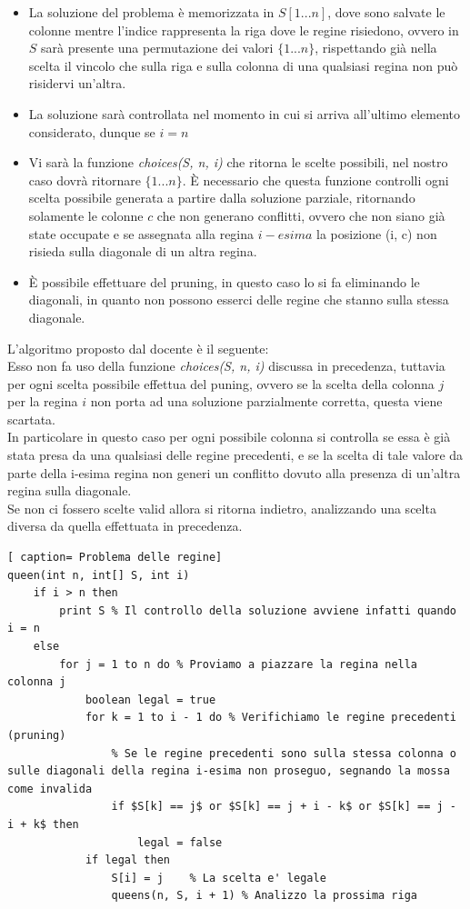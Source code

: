 \documentclass[../cheatSheetAlgoritmi.tex]{subfiles}
\begin{document}
\begin{itemize}
	\item La soluzione del problema è memorizzata in $S[1 ... n]$, dove sono salvate le colonne mentre l'indice rappresenta la riga dove le regine risiedono, ovvero in $S$ sarà presente una permutazione dei valori $\{1 ... n\}$, rispettando già nella scelta il vincolo che sulla riga e sulla colonna di una qualsiasi regina non può risidervi un'altra.
	\item La soluzione sarà controllata nel momento in cui si arriva all'ultimo elemento considerato, dunque se $i = n$
	\item Vi sarà la funzione \emph{choices(S, n, i)} che ritorna le scelte possibili, nel nostro caso dovrà ritornare $\{1 ... n\}$. È necessario che questa funzione controlli ogni scelta possibile generata a partire dalla soluzione parziale, ritornando solamente le colonne $c$ che non generano conflitti, ovvero che non siano già state occupate e se assegnata alla regina $i-esima$ la posizione (i, c) non risieda sulla diagonale di un altra regina.
	\item È possibile effettuare del pruning, in questo caso lo si fa eliminando le diagonali, in quanto non possono esserci delle regine che stanno sulla stessa diagonale.
\end{itemize}
L'algoritmo proposto dal docente è il seguente: \\
Esso non fa uso della funzione \emph{choices(S, n, i)} discussa in precedenza, tuttavia per ogni scelta possibile effettua del puning, ovvero se la scelta della colonna $j$ per la regina $i$ non porta ad una soluzione parzialmente corretta, questa viene scartata. \\
In particolare in questo caso per ogni possibile colonna si controlla se essa è già stata presa da una qualsiasi delle regine precedenti, e se la scelta di tale valore da parte della i-esima regina non generi un conflitto dovuto alla presenza di un'altra regina sulla diagonale. \\
Se non ci fossero scelte valid allora si ritorna indietro, analizzando una scelta diversa da quella effettuata in precedenza.
 \begin{lstlisting}[ caption= Problema delle regine]
queen(int n, int[] S, int i)
	if i > n then
		print S % Il controllo della soluzione avviene infatti quando i = n
	else 
		for j = 1 to n do % Proviamo a piazzare la regina nella colonna j
			boolean legal = true
			for k = 1 to i - 1 do % Verifichiamo le regine precedenti (pruning)
				% Se le regine precedenti sono sulla stessa colonna o sulle diagonali della regina i-esima non proseguo, segnando la mossa come invalida
				if $S[k] == j$ or $S[k] == j + i - k$ or $S[k] == j -  i + k$ then
					legal = false 
			if legal then
				S[i] = j	% La scelta e' legale
				queens(n, S, i + 1) % Analizzo la prossima riga
\end{lstlisting}
\end{document}
